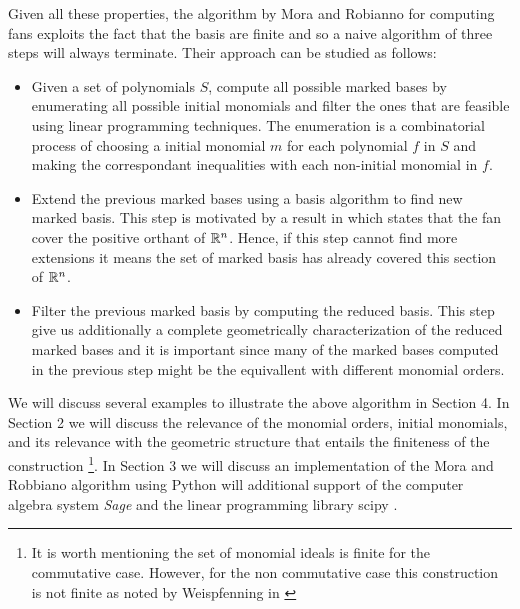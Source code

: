 Given all these properties, the algorithm by Mora and Robianno \cite{MORA1988183}
for computing \grob fans exploits the fact that the \grob basis are finite and so
a naive algorithm of three steps will always terminate. Their approach can be
studied as follows:

\begin{itemize}
\item[1.] Given a set of polynomials $S$, compute all possible marked \grob bases
  by enumerating all possible initial monomials and filter the ones that are
  feasible using linear programming techniques. The enumeration is a combinatorial
  process of choosing a initial monomial $m$ for each polynomial $f$ in $S$ and making the
  correspondant inequalities with each non-initial monomial in $f$. 
\item[2.] Extend the previous marked \grob bases using a \grob basis algorithm
  to find new marked \grob basis. This step is motivated by a result in
  \cite{Cox:2014} which states that the \grob fan cover the positive orthant
  of $\mathbb{R}^n$. Hence, if this step cannot find more extensions it means
  the set of marked \grob basis has already covered this section of $\mathbb{R}^n$.
\item[3.] Filter the previous marked \grob basis by computing the reduced \grob
  basis. This step give us additionally a complete geometrically characterization
  of the reduced marked \grob bases and it is important since many of the marked
  \grob bases computed in the previous step might be the equivallent with different
  monomial orders. 
\end{itemize}

We will discuss several examples to illustrate the above algorithm in Section 4. In Section
2 we will discuss the relevance of the monomial orders, initial monomials, and its relevance
with the geometric structure that entails the finiteness of the construction \footnote{It is worth
  mentioning the set of monomial ideals is finite for the commutative case. However, for the non
  commutative case this construction is not finite as noted by Weispfenning in
  \cite{10.1007/3-540-51082-6_96}}. In Section 3 we will discuss an implementation of the
Mora and Robbiano algorithm using Python will additional support of the computer algebra system \emph{Sage}
\cite{SageMultivariatePolynomials} and the linear programming library scipy \cite{linprog}.


